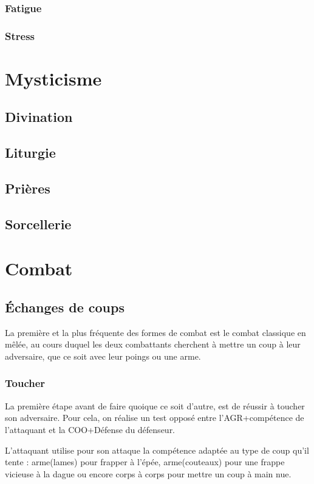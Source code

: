 \documentclass[10pt,a4paper,twocolumn]{book}
\begin{document}
\subsection{Fatigue}
\subsection{Stress}
\chapter{Mysticisme}
\section{Divination}
\section{Liturgie}
\section{Prières}
\section{Sorcellerie}

\chapter{Combat}
\section{Échanges de coups}
La première et la plus fréquente des formes de combat est le combat classique en mêlée, au cours duquel les deux combattants cherchent à mettre un coup à leur adversaire, que ce soit avec leur poings ou une arme.
\subsection{Toucher}
La première étape avant de faire quoique ce soit d'autre, est de réussir à toucher son adversaire. Pour cela, on réalise un test opposé entre l'AGR+compétence de l'attaquant et la COO+Défense du défenseur.

L'attaquant utilise pour son attaque la compétence adaptée au type de coup qu'il tente : arme(lames) pour frapper à l'épée, arme(couteaux) pour une frappe vicieuse à la dague ou encore corps à corps pour mettre un coup à main nue.
\end{document}
